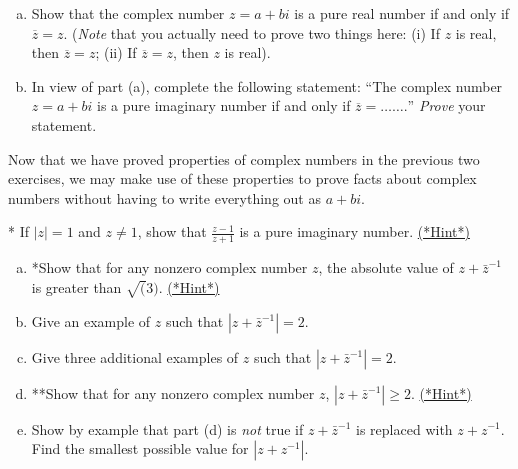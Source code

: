 \begin{exercise}\label{exercise:complex:abs1}
\begin{enumerate}[(a)]
\item
Show that the complex number $z=a+bi$ is a pure real number if and only if $\overline{z} = z$.  (\emph{Note} that you actually need to prove two things here: (i) If $z$ is real, then $\overline{z} = z$; (ii) If $\overline{z} = z$, then $z$ is real).
\item
In view of part (a), complete the following statement:  ``The complex number $z=a+bi$ is a pure imaginary number if and only if $\overline{z} = \ldots \ldots.$'' \emph{Prove} your statement.
\end{enumerate}
\end{exercise}

Now that we have proved properties of complex numbers in the previous two exercises, we may make use of these properties to prove facts about complex numbers  without having to write everything out as $a + bi$.  

\begin{exercise}\label{exercise:complex:abs2}
* If $|z| = 1$ and $z \neq 1$, show that $\frac{z - 1}{z+1}$ is a pure imaginary number. 
\hyperref[sec:complex:hints]{(*Hint*)}
\end{exercise}

\begin{exercise}\label{exercise:complex:abs3}
\begin{enumerate}[(a)]
\item *Show that for any nonzero complex number $z$, the absolute value of $z + \bar{z}^{-1}$ is greater than $\sqrt(3)$. 
\hyperref[sec:complex:hints]{(*Hint*)}

\item Give an example of $z$ such that $|z + \bar{z}^{-1}| = 2$. 
\item Give three additional examples of $z$ such that $|z + \bar{z}^{-1}| = 2$. 
\item **Show that for any nonzero complex number $z$, $|z + \bar{z}^{-1}| \ge 2$. 
\hyperref[sec:complex:hints]{(*Hint*)}
\item Show by example that part (d) is \emph{not} true if $z + \bar{z}^{-1}$ is replaced with $z + z^{-1}$.  Find the smallest possible 
value for $|z + z^{-1}|$.
\end{enumerate}
\end{exercise}



